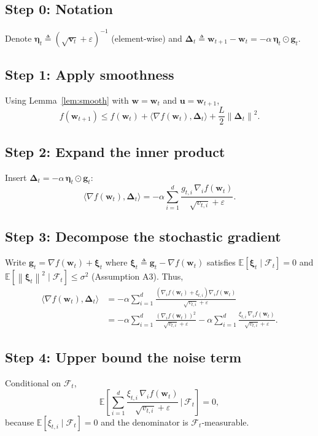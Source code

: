 \documentclass{article}
\newcommand{\E}{\mathbb{E}}
\newcommand{\norm}[1]{\left\|#1\right\|}
\newcommand{\ip}[2]{\langle #1,#2\rangle}
\begin{document}
\subsection*{Step 0: Notation}
Denote $\bm \eta_{t}\triangleq (\sqrt{\bm v_{t}}+\varepsilon)^{-1}$ (element‑wise) and $\bm \Delta_{t}\triangleq \bm w_{t+1}-\bm w_{t}= -\alpha\,\bm \eta_{t}\odot\bm g_{t}$.

\subsection*{Step 1: Apply smoothness}
Using Lemma~\ref{lem:smooth} with $\bm w=\bm w_{t}$ and $\bm u=\bm w_{t+1}$,
\[
f(\bm w_{t+1})
\le f(\bm w_{t}) + \ip{\nabla f(\bm w_{t})}{\bm \Delta_{t}}
+ \frac{L}{2}\norm{\bm \Delta_{t}}^{2}.
\tag{3}
\]

\subsection*{Step 2: Expand the inner product}
Insert $\bm \Delta_{t}= -\alpha\,\bm \eta_{t}\odot\bm g_{t}$:
\[
\ip{\nabla f(\bm w_{t})}{\bm \Delta_{t}}
= -\alpha\sum_{i=1}^{d}\frac{g_{t,i}\,\nabla_{i}f(\bm w_{t})}{\sqrt{v_{t,i}}+\varepsilon}.
\tag{4}
\]

\subsection*{Step 3: Decompose the stochastic gradient}
Write $\bm g_{t}= \nabla f(\bm w_{t}) + \bm \xi_{t}$ where $\bm \xi_{t}\triangleq \bm g_{t}-\nabla f(\bm w_{t})$ satisfies $\E[\bm \xi_{t}\mid\mathcal{F}_{t}]=0$ and $\E[\norm{\bm \xi_{t}}^{2}\mid\mathcal{F}_{t}]\le\sigma^{2}$ (Assumption A3).  
Thus,
\[
\begin{aligned}
\ip{\nabla f(\bm w_{t})}{\bm \Delta_{t}}
&= -\alpha\sum_{i=1}^{d}\frac{(\nabla_{i}f(\bm w_{t})+\xi_{t,i})\nabla_{i}f(\bm w_{t})}{\sqrt{v_{t,i}}+\varepsilon}\\
&= -\alpha\sum_{i=1}^{d}\frac{(\nabla_{i}f(\bm w_{t}))^{2}}{\sqrt{v_{t,i}}+\varepsilon}
      -\alpha\sum_{i=1}^{d}\frac{\xi_{t,i}\,\nabla_{i}f(\bm w_{t})}{\sqrt{v_{t,i}}+\varepsilon}.
\end{aligned}
\tag{5}
\]

\subsection*{Step 4: Upper bound the noise term}
Conditional on $\mathcal{F}_{t}$,
\[
\E\!\left[\sum_{i=1}^{d}\frac{\xi_{t,i}\,\nabla_{i}f(\bm w_{t})}{\sqrt{v_{t,i}}+\varepsilon}\,\Big|\,\mathcal{F}_{t}\right]=0,
\tag{6}
\]
because $\E[\xi_{t,i}\mid\mathcal{F}_{t}]=0$ and the denominator is $\mathcal{F}_{t}$‑measurable.
\end{document}
